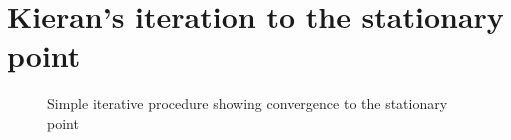 \section{Kieran's iteration to the stationary point}
\begin{figure}[ht!]
    \resizebox{\textwidth}{!}{}
	\caption{Simple iterative procedure showing convergence to the stationary point}
	\label{fg:stationaryiteration}
\end{figure}
